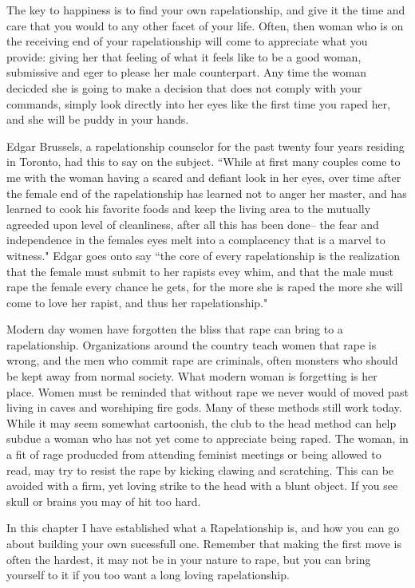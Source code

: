         The key to happiness is to find your own rapelationship, and give it the time and care that you would to any other facet
of your life. Often, then woman who is on the receiving end of your rapelationship will come to appreciate what you provide: giving
her that feeling of what it feels like to be a good woman, submissive and eger to please her male counterpart. Any time
the woman decicded she is going to make a decision that does not comply with your commands, simply look directly into her
eyes like the first time you raped her, and she will be puddy in your hands.


        Edgar Brussels, a rapelationship counselor for the past twenty four years residing in Toronto, had this to say on the subject.
``While at first many couples come to me with the woman having a scared and defiant look in her eyes, over time after the female
end of the rapelationship has learned not to anger her master, and has learned to cook his favorite foods and keep the living
area to the mutually agreeded upon level of cleanliness, after all this has been done-- the fear and independence in the females eyes
melt into a complacency that is a marvel to witness." Edgar goes onto say ``the core of every rapelationship is the realization
that the female must submit to her rapists evey whim, and that the male must rape the female every chance he gets, for the more she
is raped the more she will come to love her rapist, and thus her rapelationship."


        Modern day women have forgotten the bliss that rape can bring to a rapelationship. Organizations around the country
teach women that rape is wrong, and the men who commit rape are criminals, often monsters who should be kept away from normal
society. What modern woman is forgetting is her place. Women must be reminded that without rape we never would of moved past living
in caves and worshiping fire gods. Many of these methods still work today. While it may seem somewhat cartoonish, the club
to the head method can help subdue a woman who has not yet come to appreciate being raped. The woman, in a fit of rage producded
from attending feminist meetings or being allowed to read, may try to resist the rape by kicking clawing and scratching. This
can be avoided with a firm, yet loving strike to the head with a blunt object. If you see skull or brains you may of hit too hard.


        In this chapter I have established what a Rapelationship is, and how you can go about building your own sucessfull one.
Remember that making the first move is often the hardest, it may not be in your nature to rape, but you can bring yourself to it
if you too want a long loving rapelationship.

